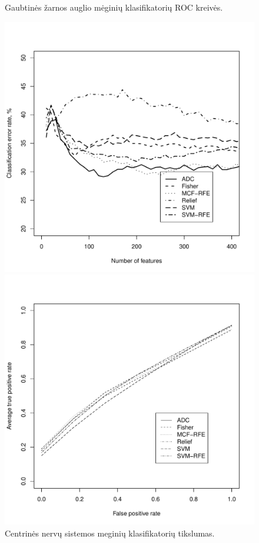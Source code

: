 \begin{figure}[H]
\begin{minipage}[b]{0.45\linewidth}
\caption{Gaubtinės žarnos auglio mėginių klasifikatorių ROC kreivės.}
\label{fig:roc_colon}
\end{minipage}
\hspace{0.2cm}
\begin{minipage}[b]{0.47\linewidth}
\centering
\includegraphics[width=.85\textwidth]{../bachelor/images/nncns_classification.pdf}
\caption{Centrinės nervų sistemos meginių klasifikatorių tikslumas.}
\label{fig:class_cns}
\end{minipage}
\hspace{0.2cm}
\begin{minipage}[b]{0.5\linewidth}
\centering
\includegraphics[width=.85\textwidth]{../bachelor/images/nncns_roc.pdf}

\end{minipage}
\end{figure}
